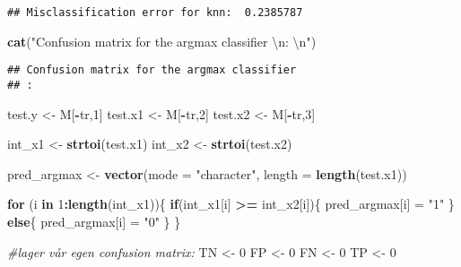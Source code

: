 \documentclass[]{article}
\newenvironment{Shaded}{\begin{snugshade}}{\end{snugshade}}
\newcommand{\KeywordTok}[1]{\textcolor[rgb]{0.13,0.29,0.53}{\textbf{#1}}}
\newcommand{\DataTypeTok}[1]{\textcolor[rgb]{0.13,0.29,0.53}{#1}}
\newcommand{\DecValTok}[1]{\textcolor[rgb]{0.00,0.00,0.81}{#1}}
\newcommand{\CharTok}[1]{\textcolor[rgb]{0.31,0.60,0.02}{#1}}
\newcommand{\StringTok}[1]{\textcolor[rgb]{0.31,0.60,0.02}{#1}}
\newcommand{\CommentTok}[1]{\textcolor[rgb]{0.56,0.35,0.01}{\textit{#1}}}
\newcommand{\ControlFlowTok}[1]{\textcolor[rgb]{0.13,0.29,0.53}{\textbf{#1}}}
\newcommand{\OperatorTok}[1]{\textcolor[rgb]{0.81,0.36,0.00}{\textbf{#1}}}
\newcommand{\NormalTok}[1]{#1}
\begin{document}
\begin{verbatim}
## Misclassification error for knn:  0.2385787
\end{verbatim}

\begin{Shaded}
\begin{Highlighting}[]
\KeywordTok{cat}\NormalTok{(}\StringTok{"Confusion matrix for the argmax classifier }\CharTok{\textbackslash{}n}\StringTok{: }\CharTok{\textbackslash{}n}\StringTok{"}\NormalTok{)}
\end{Highlighting}
\end{Shaded}

\begin{verbatim}
## Confusion matrix for the argmax classifier 
## :
\end{verbatim}

\begin{Shaded}
\begin{Highlighting}[]
\NormalTok{test.y <-}\StringTok{ }\NormalTok{M[}\OperatorTok{-}\NormalTok{tr,}\DecValTok{1}\NormalTok{]}
\NormalTok{test.x1 <-}\StringTok{ }\NormalTok{M[}\OperatorTok{-}\NormalTok{tr,}\DecValTok{2}\NormalTok{]}
\NormalTok{test.x2 <-}\StringTok{ }\NormalTok{M[}\OperatorTok{-}\NormalTok{tr,}\DecValTok{3}\NormalTok{]}

\NormalTok{int_x1 <-}\StringTok{ }\KeywordTok{strtoi}\NormalTok{(test.x1)}
\NormalTok{int_x2 <-}\StringTok{ }\KeywordTok{strtoi}\NormalTok{(test.x2)}

\NormalTok{pred_argmax <-}\StringTok{ }\KeywordTok{vector}\NormalTok{(}\DataTypeTok{mode =} \StringTok{"character"}\NormalTok{, }\DataTypeTok{length =} \KeywordTok{length}\NormalTok{(test.x1))}

\ControlFlowTok{for}\NormalTok{ (i }\ControlFlowTok{in} \DecValTok{1}\OperatorTok{:}\KeywordTok{length}\NormalTok{(int_x1))\{}
  \ControlFlowTok{if}\NormalTok{(int_x1[i] }\OperatorTok{>=}\StringTok{ }\NormalTok{int_x2[i])\{}
\NormalTok{    pred_argmax[i] =}\StringTok{ "1"}
\NormalTok{    \}}
  \ControlFlowTok{else}\NormalTok{\{}
\NormalTok{    pred_argmax[i] =}\StringTok{ "0"}
\NormalTok{  \}}
\NormalTok{\}}

\CommentTok{#lager vår egen confusion matrix:}
\NormalTok{TN <-}\StringTok{ }\DecValTok{0}
\NormalTok{FP <-}\StringTok{ }\DecValTok{0}
\NormalTok{FN <-}\StringTok{ }\DecValTok{0}
\NormalTok{TP <-}\StringTok{ }\DecValTok{0}


\end{Highlighting}
\end{Shaded}
\end{document}
